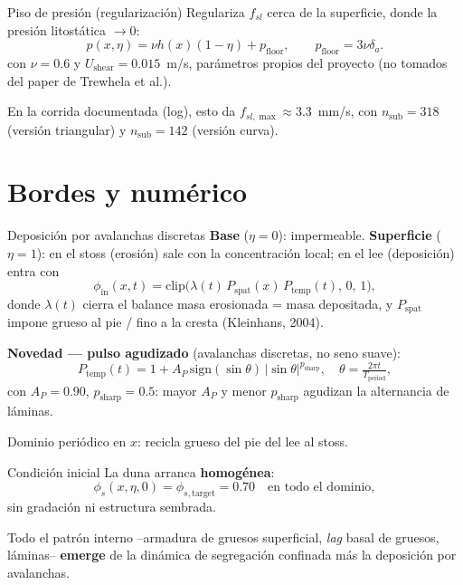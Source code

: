\documentclass[11pt]{beamer}
\begin{document}
\begin{frame}{Piso de presión (regularización)}
Regulariza $f_{sl}$ cerca de la superficie, donde la presión litostática $\to 0$:
\begin{equation*}
    p(x,\eta) = \nu h(x)(1-\eta) + p_{\mathrm{floor}}, \qquad p_{\mathrm{floor}}=3\nu\delta_a .
\end{equation*}
con $\nu=0.6$ y $U_{\mathrm{shear}}=0.015$~m/s, parámetros propios del proyecto (no tomados del paper de Trewhela et al.).

\vspace{6pt}
En la corrida documentada (log), esto da $f_{sl,\max}\approx3.3$~mm/s, con $n_{\mathrm{sub}}=318$ (versión triangular) y $n_{\mathrm{sub}}=142$ (versión curva).
\end{frame}

\section{Bordes y numérico}

\begin{frame}{Deposición por avalanchas discretas}
\textbf{Base} ($\eta=0$): impermeable. \textbf{Superficie} ($\eta=1$): en el stoss (erosión) sale con la concentración local; en el lee (deposición) entra con
\begin{equation*}
    \phi_{\mathrm{in}}(x,t) = \mathrm{clip}\big(\lambda(t)\,P_{\mathrm{spat}}(x)\,P_{\mathrm{temp}}(t),\,0,\,1\big),
\end{equation*}
donde $\lambda(t)$ cierra el balance masa erosionada = masa depositada, y $P_{\mathrm{spat}}$ impone grueso al pie / fino a la cresta (Kleinhans, 2004).

\vspace{4pt}
\textbf{Novedad — pulso agudizado} (avalanchas discretas, no seno suave):
\begin{equation*}
    P_{\mathrm{temp}}(t) = 1 + A_P\,\mathrm{sign}(\sin\theta)\,|\sin\theta|^{p_{\mathrm{sharp}}}, \quad \theta=\tfrac{2\pi t}{T_{\mathrm{period}}},
\end{equation*}
con $A_P=0.90$, $p_{\mathrm{sharp}}=0.5$: mayor $A_P$ y menor $p_{\mathrm{sharp}}$ agudizan la alternancia de láminas.

\vspace{2pt}
Dominio periódico en $x$: recicla grueso del pie del lee al stoss.
\end{frame}

\begin{frame}{Condición inicial}
La duna arranca \textbf{homogénea}:
\begin{equation*}
    \phi_s(x,\eta,0) = \phi_{s,\mathrm{target}} = 0.70 \quad \text{en todo el dominio},
\end{equation*}
sin gradación ni estructura sembrada.

\vspace{6pt}
Todo el patrón interno --armadura de gruesos superficial, \emph{lag} basal de gruesos, láminas-- \textbf{emerge} de la dinámica de segregación confinada más la deposición por avalanchas.
\end{frame}
\end{document}
